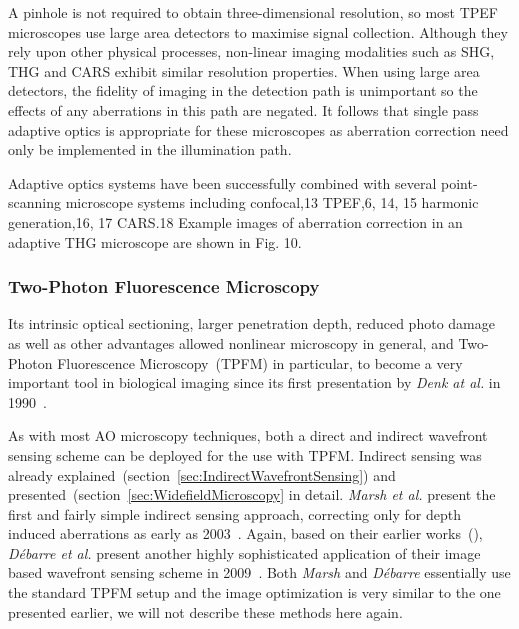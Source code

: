 A pinhole is not required to obtain three-dimensional resolution, so most 
TPEF microscopes use large area detectors to maximise signal collection. 
Although they rely upon other physical processes, non-linear imaging 
modalities such as SHG, THG and CARS exhibit similar resolution properties. 
When using large area detectors, the fidelity of imaging in the detection 
path is unimportant so the effects of any aberrations in this path are 
negated. It follows that single pass adaptive optics is appropriate for these 
microscopes as aberration correction need only be implemented in the 
illumination path.

Adaptive optics systems have been successfully combined with several point-
scanning microscope systems including confocal,13 TPEF,6, 14, 15 harmonic 
generation,16, 17 CARS.18 Example images of aberration correction in an 
adaptive THG microscope are shown in Fig. 10.

\cite{book_confocal}
\cite{scan_CFM}

\subsubsection{Two-Photon Fluorescence Microscopy}
\label{sec:twoPhotonExcitation}

Its intrinsic optical sectioning, larger penetration depth, reduced photo damage as well as other advantages allowed nonlinear microscopy in general, and Two-Photon Fluorescence Microscopy~(TPFM) in particular, to become a very important tool in biological imaging since its first presentation by \emph{Denk at al.} in 1990~\cite{scan_TPFM_principle}.

As with most AO microscopy techniques, both a direct and indirect wavefront sensing scheme can be deployed for the use with TPFM. Indirect sensing was already explained~(section~\ref{sec:IndirectWavefrontSensing}) and presented~(section~\ref{sec:WidefieldMicroscopy} in detail. \emph{Marsh et al.} present the first and fairly simple indirect sensing approach, correcting only for depth induced aberrations as early as 2003~\cite{scan_TPFM_pratical}. Again, based on their earlier works~(\cite{wide_AOM_loew_freq,wide_AOM_structured_illu}), \emph{D\'{e}barre et al.} present another highly sophisticated application of their image based wavefront sensing scheme in 2009~\cite{scan_TPFM_image_based}. Both \emph{Marsh} and \emph{D\'{e}barre} essentially use the standard TPFM setup and the image optimization is very similar to the one presented earlier, we will not describe these methods here again.


